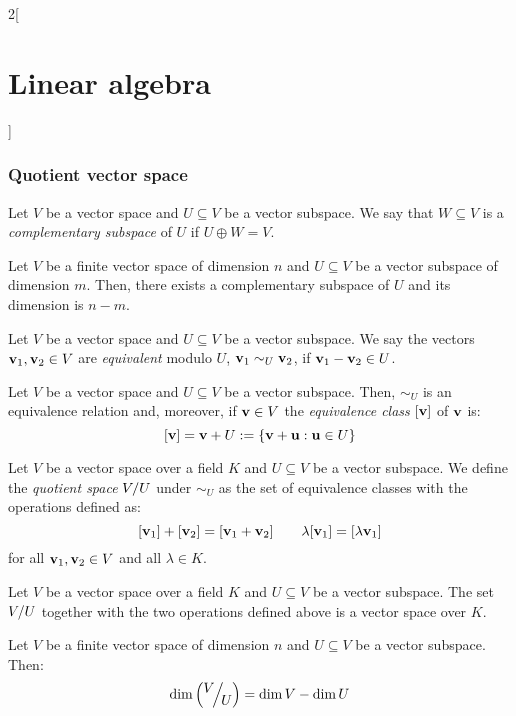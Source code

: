 \documentclass[../../../main.tex]{subfiles}
\begin{document}
\begin{multicols}{2}[\section{Linear algebra}]
  \subsubsection{Quotient vector space}
  \begin{definition}
    Let $V$ be a vector space and $U\subseteq V$ be a vector subspace. We say that $W\subseteq V$ is a \emph{complementary subspace} of $U$ if $U\oplus W=V$.
  \end{definition}
  \begin{definition}
    Let $V$ be a finite vector space of dimension $n$ and $U\subseteq V$ be a vector subspace of dimension $m$. Then, there exists a complementary subspace of $U$ and its dimension is $n-m$.
  \end{definition}
  \begin{definition}
    Let $V$ be a vector space and $U\subseteq V$ be a vector subspace. We say the vectors $\boldsymbol{\mathrm{v}}_1,\boldsymbol{\mathrm{v}}_2\in V$ are \emph{equivalent} modulo $U$, $\boldsymbol{\mathrm{v}}_1\sim_U\boldsymbol{\mathrm{v}}_2$, if $\boldsymbol{\mathrm{v}}_1-\boldsymbol{\mathrm{v}}_2\in U$.
  \end{definition}
  \begin{lemma}
    Let $V$ be a vector space and $U\subseteq V$ be a vector subspace. Then, $\sim_U$ is an equivalence relation and, moreover, if $\boldsymbol{\mathrm{v}}\in V$ the \emph{equivalence class} $[\boldsymbol{\mathrm{v}}]$ of $\boldsymbol{\mathrm{v}}$ is: $$[\boldsymbol{\mathrm{v}}]=\boldsymbol{\mathrm{v}}+U:=\{\boldsymbol{\mathrm{v}}+\boldsymbol{\mathrm{u}}:\boldsymbol{\mathrm{u}}\in U\}$$
  \end{lemma}
  \begin{definition}
    Let $V$ be a vector space over a field $K$ and $U\subseteq V$ be a vector subspace. We define the \emph{quotient space} $\quot{V}{U}$ under $\sim_U$ as the set of equivalence classes with the operations defined as:
    $$[\boldsymbol{\mathrm{v}}_1]+[\boldsymbol{\mathrm{v}}_2]=[\boldsymbol{\mathrm{v}}_1+\boldsymbol{\mathrm{v}}_2]\qquad \lambda[\boldsymbol{\mathrm{v}}_1]=[\lambda\boldsymbol{\mathrm{v}}_1]$$
    for all $\boldsymbol{\mathrm{v}}_1,\boldsymbol{\mathrm{v}}_2\in V$ and all $\lambda\in K$.
  \end{definition}
  \begin{proposition}
    Let $V$ be a vector space over a field $K$ and $U\subseteq V$ be a vector subspace. The set $\quot{V}{U}$ together with the two operations defined above is a vector space over $K$.
  \end{proposition}
  \begin{proposition}
    Let $V$ be a finite vector space of dimension $n$ and $U\subseteq V$ be a vector subspace. Then: $$\dim\left(\quot{V}{U}\right)=\dim V-\dim U$$
  \end{proposition}

\end{multicols}
\end{document}

